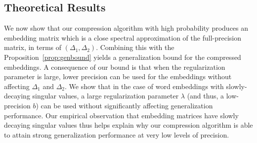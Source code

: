 \subsection{Theoretical Results}
\label{sec:theory_results}
We now show that our compression algorithm with high probability produces an embedding matrix which is a close spectral approximation of the full-precision matrix, in terms of $(\Delta_1,\Delta_2)$.
Combining this with the Proposition~\ref{prop:genbound} yields a generalization bound for the compressed embeddings.
A consequence of our bound is that when the regularization parameter is large, lower precision can be used for the embeddings without affecting $\Delta_1$ and $\Delta_2$.
We show that in the case of word embeddings with slowly-decaying singular values, a large regularization parameter $\lambda$ (and thus, a low-precision $b$) can be used without significantly affecting generalization performance.
Our empirical observation that embedding matrices have slowly decaying singular values thus helps explain why our compression algorithm is able to attain strong generalization performance at very low levels of precision.

